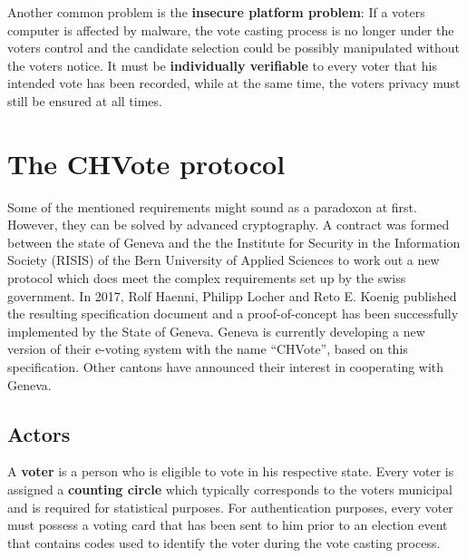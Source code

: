 Another common problem is the \textbf{insecure platform problem}: If a voters computer is affected by malware, the vote casting process is no longer under the voters control and the candidate selection could be possibly manipulated without the voters notice. It must be \textbf{individually verifiable} to every voter that his intended vote has been recorded, while at the same time, the voters privacy must still be ensured at all times. 

\section{The CHVote protocol}
Some of the mentioned requirements might sound as a paradoxon at first. However, they can be solved by advanced cryptography. A contract was formed between the state of Geneva and the the Institute for Security in the Information Society (RISIS) of the Bern University of Applied Sciences to work out a new protocol which does meet the complex requirements set up by the swiss government. In 2017, Rolf Haenni, Philipp Locher and Reto E. Koenig published the resulting specification document and a proof-of-concept has been successfully implemented by the State of Geneva. Geneva is currently developing a new version of their e-voting system with the name "`CHVote"', based on this specification. Other cantons have announced their interest in cooperating with Geneva.

\subsection{Actors}
A \textbf{voter} is a person who is eligible to vote in his respective state. Every voter is assigned a \textbf{counting circle} which typically corresponds to the voters municipal and is required for statistical purposes. For authentication purposes, every voter must possess a voting card that has been sent to him prior to an election event that contains codes used to identify the voter during the vote casting process.

